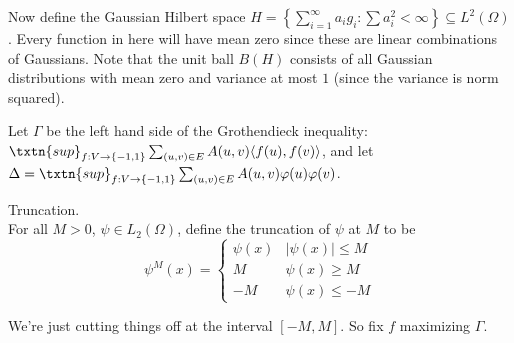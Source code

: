 Now define the Gaussian Hilbert space $H = \left\{\sum_{i = 1}^{\infty} a_i g_i: \sum a_i^2 < \infty\right\} \subseteq L^2(\Omega)$. Every function in here will have mean zero since these are linear combinations of Gaussians. Note that the unit ball $B(H)$ consists of all Gaussian distributions with mean zero and variance at most $1$ (since the variance is norm squared). 

Let $\Gamma$ be the left hand side of the Grothendieck inequality: $\txtn{sup}_{f: V \to \{-1, 1\}} \sum_{(u, v) \in E} A(u, v) \langle f(u), f(v) \rangle$, and let $\Delta = \txtn{sup}_{f: V \to \{-1, 1\}} \sum_{(u, v) \in E} A(u, v)\varphi(u)\varphi(v)$. 

\begin{df} Truncation. \\
For all $M > 0$, $\psi \in L_2(\Omega)$, define the truncation of $\psi$ at $M$ to be
\[
\psi^M(x) = 
\begin{cases}
\psi(x) & |\psi(x)| \leq M \\
M & \psi(x) \geq M \\
-M & \psi(x) \leq -M
\end{cases}
\] 
\end{df}
We're just cutting things off at the interval $[-M, M]$. 
So fix $f$ maximizing $\Gamma$. 

